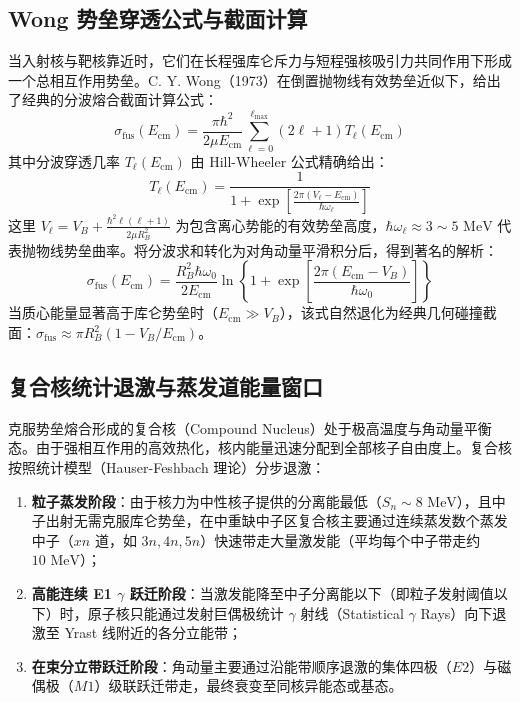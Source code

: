 \subsection{Wong 势垒穿透公式与截面计算}

当入射核与靶核靠近时，它们在长程强库仑斥力与短程强核吸引力共同作用下形成一个总相互作用势垒。C. Y. Wong（1973）在倒置抛物线有效势垒近似下，给出了经典的分波熔合截面计算公式：
\begin{equation}
    \sigma_{\text{fus}}(E_{\text{cm}}) = \frac{\pi\hbar^2}{2\mu E_{\text{cm}}} \sum_{\ell=0}^{\ell_{\text{max}}} (2\ell + 1) T_\ell(E_{\text{cm}})
    \label{eq:wong_sum}
\end{equation}
其中分波穿透几率 $T_\ell(E_{\text{cm}})$ 由 Hill-Wheeler 公式精确给出：
\begin{equation}
    T_\ell(E_{\text{cm}}) = \frac{1}{1 + \exp \left[ \frac{2\pi (V_\ell - E_{\text{cm}})}{\hbar\omega_\ell} \right]}
\end{equation}
这里 $V_\ell = V_B + \frac{\hbar^2 \ell(\ell+1)}{2\mu R_B^2}$ 为包含离心势能的有效势垒高度，$\hbar\omega_\ell \approx 3 \sim 5\text{ MeV}$ 代表抛物线势垒曲率。将分波求和转化为对角动量平滑积分后，得到著名的解析：
\begin{equation}
    \sigma_{\text{fus}}(E_{\text{cm}}) = \frac{R_B^2 \hbar\omega_0}{2 E_{\text{cm}}} \ln \left\{ 1 + \exp \left[ \frac{2\pi (E_{\text{cm}} - V_B)}{\hbar\omega_0} \right] \right\}
    \label{eq:wong_analytic}
\end{equation}
当质心能量显著高于库仑势垒时（$E_{\text{cm}} \gg V_B$），该式自然退化为经典几何碰撞截面：$\sigma_{\text{fus}} \approx \pi R_B^2 (1 - V_B/E_{\text{cm}})$。

\subsection{复合核统计退激与蒸发道能量窗口}

克服势垒熔合形成的复合核（Compound Nucleus）处于极高温度与角动量平衡态。由于强相互作用的高效热化，核内能量迅速分配到全部核子自由度上。复合核按照统计模型（Hauser-Feshbach 理论）分步退激：
\begin{enumerate}
    \item \textbf{粒子蒸发阶段}：由于核力为中性核子提供的分离能最低（$S_n \sim 8\text{ MeV}$），且中子出射无需克服库仑势垒，在中重缺中子区复合核主要通过连续蒸发数个蒸发中子（$xn$ 道，如 $3n, 4n, 5n$）快速带走大量激发能（平均每个中子带走约 $10\text{ MeV}$）；
    \item \textbf{高能连续 E1 $\gamma$ 跃迁阶段}：当激发能降至中子分离能以下（即粒子发射阈值以下）时，原子核只能通过发射巨偶极统计 $\gamma$ 射线（Statistical $\gamma$ Rays）向下退激至 Yrast 线附近的各分立能带；
    \item \textbf{在束分立带跃迁阶段}：角动量主要通过沿能带顺序退激的集体四极（$E2$）与磁偶极（$M1$）级联跃迁带走，最终衰变至同核异能态或基态。
\end{enumerate}


